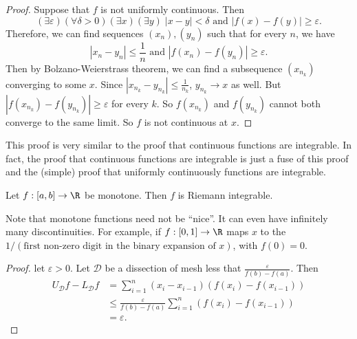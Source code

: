 \documentclass[a4paper]{article}
\begin{document}
\begin{proof}
  Suppose that $f$ is not uniformly continuous. Then
  \[
    (\exists \varepsilon)(\forall \delta > 0)(\exists x)(\exists y)\;|x - y| < \delta \text{ and } |f(x) - f(y)| \geq \varepsilon.
  \]
  Therefore, we can find sequences $(x_n), (y_n)$ such that for every $n$, we have
  \[
    |x_n - y_n| \leq \frac{1}{n}\text{ and }|f(x_n) - f(y_n)| \geq \varepsilon.
  \]
  Then by Bolzano-Weierstrass theorem, we can find a subsequence $(x_{n_k})$ converging to some $x$. Since $|x_{n_k} - y_{n_k}| \leq \frac{1}{n_k}$, $y_{n_k}\to x$ as well. But $|f(x_{n_k}) - f(y_{n_k})| \geq \varepsilon$ for every $k$. So $f(x_{n_k})$ and $f(y_{n_k})$ cannot both converge to the same limit. So $f$ is not continuous at $x$.
\end{proof}
This proof is very similar to the proof that continuous functions are integrable. In fact, the proof that continuous functions are integrable is just a fuse of this proof and the (simple) proof that uniformly continuously functions are integrable.

\begin{thm}
  Let $f: [a, b] \to \R$ be monotone. Then $f$ is Riemann integrable.
\end{thm}
Note that monotone functions need not be ``nice''. It can even have infinitely many discontinuities. For example, if $f: [0, 1] \to \R$ maps $x$ to the $1/(\text{first non-zero digit in the binary expansion of }x)$, with $f(0) = 0$.

\begin{proof}
  let $\varepsilon > 0$. Let $\mathcal{D}$ be a dissection of mesh less that $\frac{\varepsilon}{f(b) - f(a)}$. Then
  \begin{align*}
    U_\mathcal{D} f - L_\mathcal{D}f &= \sum_{i = 1}^n (x_i - x_{i - 1})(f(x_i) - f(x_{i - 1}))\\
    &\leq \frac{\varepsilon}{f(b) - f(a)} \sum_{i = 1}^n (f(x_i) - f(x_{i - 1}))\\
    &= \varepsilon.
  \end{align*}
\end{proof}
\end{document}
